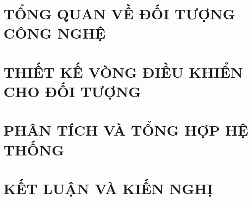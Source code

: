 \documentclass[a4paper,13pt,3p,oneside]{report}
\renewcommand{\headrulewidth}{0pt}
\theoremstyle{definition}
\begin{document}
\renewcommand*{\entryname}{Thuật ngữ/từ viết tắt}

\renewcommand{\arraystretch}{1.5} %

\printnoidxglossary[type=acronym,
                    title={DANH MỤC TỪ VIẾT TẮT},
                    toctitle={Danh sách thuật ngữ/viết tắt}]



    
\cleardoublepage
{}

\pagestyle{fancy}
\fancyhf{}
\renewcommand{\headrulewidth}{0.4pt}
\setlength{\headheight}{35pt}
\makeatletter
\renewcommand{\chaptermark}[1]{\markboth{CHƯƠNG \thechapter.\ #1}{}}
\makeatother
\fancyhead[LO]{\nouppercase{\leftmark}}
\fancyhead[RE]{\nouppercase{\leftmark}}
\fancyfoot[RO,LE]{\thepage}
\renewcommand{\sectionmark}[1]{}

\newpage
\chapter{TỔNG QUAN VỀ ĐỐI TƯỢNG CÔNG NGHỆ}
\label{chuong1}

\newpage
\chapter{THIẾT KẾ VÒNG ĐIỀU KHIỂN CHO ĐỐI TƯỢNG}
\label{chuong2}


\newpage
\chapter{PHÂN TÍCH VÀ TỔNG HỢP HỆ THỐNG}
\label{chuong3}


\newpage
\chapter{KẾT LUẬN VÀ KIẾN NGHỊ}
\label{chuong4}

\end{document}
